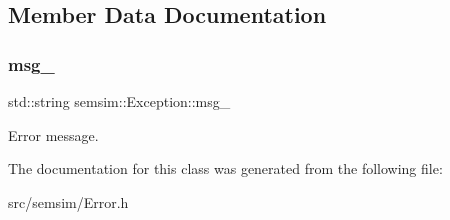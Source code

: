 \subsection{Member Data Documentation}
\mbox{\label{classsemsim_1_1Exception_a536284719db9cd57b8762e6e5a5a8820}} 
\subsubsection{\texorpdfstring{msg\+\_\+}{msg\_}}
{\footnotesize\ttfamily std\+::string semsim\+::\+Exception\+::msg\+\_\+\hspace{0.3cm}{\ttfamily [protected]}}

Error message. 

The documentation for this class was generated from the following file\+:\begin{DoxyCompactItemize}
\item 
src/semsim/Error.\+h\end{DoxyCompactItemize}

